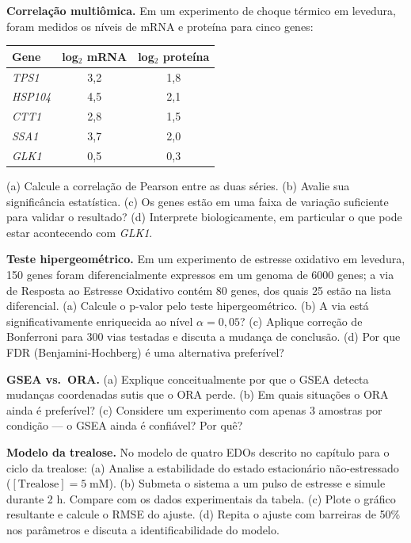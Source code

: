 \begin{exercicio}
\textbf{Correlação multiômica.} Em um experimento de choque térmico em
levedura, foram medidos os níveis de mRNA e proteína para cinco genes:

\begin{center}
\begin{tabular}{lcc}
\toprule
\textbf{Gene} & \textbf{log$_2$ mRNA} & \textbf{log$_2$ proteína} \\
\midrule
\textit{TPS1} & 3{,}2 & 1{,}8 \\
\textit{HSP104} & 4{,}5 & 2{,}1 \\
\textit{CTT1} & 2{,}8 & 1{,}5 \\
\textit{SSA1} & 3{,}7 & 2{,}0 \\
\textit{GLK1} & 0{,}5 & 0{,}3 \\
\bottomrule
\end{tabular}
\end{center}

(a) Calcule a correlação de Pearson entre as duas séries. (b) Avalie sua
significância estatística. (c) Os genes estão em uma faixa de variação
suficiente para validar o resultado? (d) Interprete biologicamente, em
particular o que pode estar acontecendo com \textit{GLK1}.
\end{exercicio}

\begin{exercicio}
\textbf{Teste hipergeométrico.} Em um experimento de estresse oxidativo em
levedura, 150 genes foram diferencialmente expressos em um genoma de 6000
genes; a via de Resposta ao Estresse Oxidativo contém 80 genes, dos quais
25 estão na lista diferencial. (a) Calcule o p-valor pelo teste
hipergeométrico. (b) A via está significativamente enriquecida ao nível
$\alpha = 0{,}05$? (c) Aplique correção de Bonferroni para 300 vias testadas
e discuta a mudança de conclusão. (d) Por que FDR (Benjamini-Hochberg) é
uma alternativa preferível?
\end{exercicio}

\begin{exercicio}
\textbf{GSEA vs.\ ORA.} (a) Explique conceitualmente por que o GSEA detecta
mudanças coordenadas sutis que o ORA perde. (b) Em quais situações o ORA
ainda é preferível? (c) Considere um experimento com apenas 3 amostras por
condição --- o GSEA ainda é confiável? Por quê?
\end{exercicio}

\begin{exercicio}
\textbf{Modelo da trealose.} No modelo de quatro EDOs descrito no capítulo
para o ciclo da trealose: (a) Analise a estabilidade do estado estacionário
não-estressado ($[\text{Trealose}] = 5\;\mathrm{mM}$). (b) Submeta o sistema
a um pulso de estresse e simule durante 2 h. Compare com os dados
experimentais da tabela. (c) Plote o gráfico resultante e calcule o RMSE
do ajuste. (d) Repita o ajuste com barreiras de 50\% nos parâmetros e
discuta a identificabilidade do modelo.
\end{exercicio}

